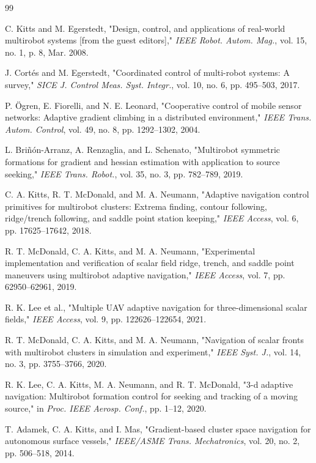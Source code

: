 \documentclass[lettersize,journal]{IEEEtran}
\begin{document}
\begin{thebibliography}{99}

 C. Kitts and M. Egerstedt, "Design, control, and applications of real-world multirobot systems [from the guest editors]," \textit{IEEE Robot. Autom. Mag.}, vol. 15, no. 1, p. 8, Mar. 2008.

 J. Cortés and M. Egerstedt, "Coordinated control of multi-robot systems: A survey," \textit{SICE J. Control Meas. Syst. Integr.}, vol. 10, no. 6, pp. 495--503, 2017.

 P. Ögren, E. Fiorelli, and N. E. Leonard, "Cooperative control of mobile sensor networks: Adaptive gradient climbing in a distributed environment," \textit{IEEE Trans. Autom. Control}, vol. 49, no. 8, pp. 1292--1302, 2004.

 L. Briñón-Arranz, A. Renzaglia, and L. Schenato, "Multirobot symmetric formations for gradient and hessian estimation with application to source seeking," \textit{IEEE Trans. Robot.}, vol. 35, no. 3, pp. 782--789, 2019.

 C. A. Kitts, R. T. McDonald, and M. A. Neumann, "Adaptive navigation control primitives for multirobot clusters: Extrema finding, contour following, ridge/trench following, and saddle point station keeping," \textit{IEEE Access}, vol. 6, pp. 17625--17642, 2018.

 R. T. McDonald, C. A. Kitts, and M. A. Neumann, "Experimental implementation and verification of scalar field ridge, trench, and saddle point maneuvers using multirobot adaptive navigation," \textit{IEEE Access}, vol. 7, pp. 62950--62961, 2019.

 R. K. Lee et al., "Multiple UAV adaptive navigation for three-dimensional scalar fields," \textit{IEEE Access}, vol. 9, pp. 122626--122654, 2021.

 R. T. McDonald, C. A. Kitts, and M. A. Neumann, "Navigation of scalar fronts with multirobot clusters in simulation and experiment," \textit{IEEE Syst. J.}, vol. 14, no. 3, pp. 3755--3766, 2020.

 R. K. Lee, C. A. Kitts, M. A. Neumann, and R. T. McDonald, "3-d adaptive navigation: Multirobot formation control for seeking and tracking of a moving source," in \textit{Proc. IEEE Aerosp. Conf.}, pp. 1--12, 2020.

 T. Adamek, C. A. Kitts, and I. Mas, "Gradient-based cluster space navigation for autonomous surface vessels," \textit{IEEE/ASME Trans. Mechatronics}, vol. 20, no. 2, pp. 506--518, 2014.


\end{thebibliography}
\end{document}
